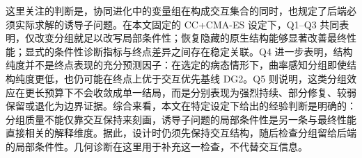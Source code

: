 这里关注的判断是，协同进化中的变量组在构成交互集合的同时，也规定了后端必须实际求解的诱导子问题。在本文固定的 CC+CMA-ES 设定下，Q1--Q3 共同表明，仅改变分组就足以改写局部条件性；恢复隐藏的原生结构能够显著改善最终性能；显式的条件性诊断指标与终点差异之间存在稳定关联。Q4 进一步表明，结构纯度并不是终点表现的充分预测因子：在选定的病态情形下，曲率感知分组即使结构纯度更低，也仍可能在终点上优于交互优先基线 DG2。Q5 则说明，这类分组效应在更长预算下不会收敛成单一结局，而是分别表现为强烈持续、部分修复、较弱保留或退化为边界证据。综合来看，本文在特定设定下给出的经验判断是明确的：分组质量不能仅靠交互保持来刻画，诱导子问题的局部条件性是另一条与最终性能直接相关的解释维度。据此，设计时仍须先保持交互结构，随后检查分组留给后端的局部条件性。几何诊断在这里用于补充这一检查，不代替交互信息。
